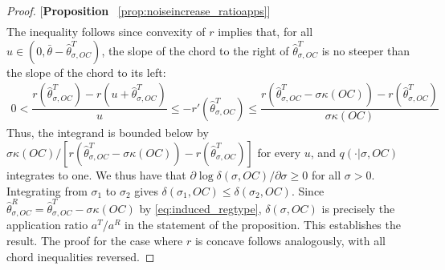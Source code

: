 \begin{proof}{[\textbf{Proposition} ~\ref{prop:noiseincrease_ratioapps}]}
\begin{align*}
\end{align*}
The inequality follows since convexity of $r$ implies that, for all $u\in(0,\bar{\theta}-\hat{\theta}^T_{\sigma,OC})$, the slope of the chord to the right of $\hat{\theta}^T_{\sigma,OC}$ is no steeper than the slope of the chord to its left:
\begin{align*}
    0< \dfrac{r(\hat{\theta}^T_{\sigma,OC})-r(u+\hat{\theta}^T_{\sigma,OC})}{u} \leq -r'(\hat{\theta}^T_{\sigma,OC}) \leq \dfrac{r(\hat{\theta}^T_{\sigma,OC}-\sigma \kappa(OC))-r(\hat{\theta}^T_{\sigma,OC})}{\sigma\kappa(OC)}
\end{align*}
Thus, the integrand is bounded below by $\sigma\kappa(OC)/[r(\hat{\theta}^T_{\sigma,OC}-\sigma \kappa(OC))-r(\hat{\theta}^T_{\sigma,OC})]$ for every $u$, and $q(\cdot|\sigma,OC)$ integrates to one. We thus have that $\partial \log \delta(\sigma,OC)/\partial \sigma \geq 0$ for all $\sigma>0$. Integrating from $\sigma_1$ to $\sigma_2$ gives $\delta(\sigma_1,OC)\leq \delta(\sigma_2,OC)$. Since $\hat{\theta}^R_{\sigma,OC} = \hat{\theta}^T_{\sigma,OC}-\sigma\kappa(OC)$ by \eqref{eq:induced_regtype}, $\delta(\sigma,OC)$ is precisely the application ratio $a^T/a^R$ in the statement of the proposition. This establishes the result. The proof for the case where $r$ is concave follows analogously, with all chord inequalities reversed.
\end{proof}

